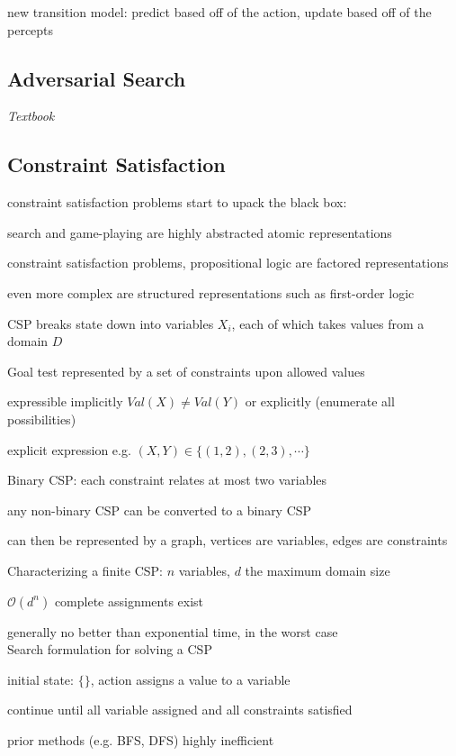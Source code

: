 \documentclass[12pt]{article}
\begin{document}
new transition model: predict based off of the action, update based off of the percepts

\subsection{Adversarial Search}

\textit{Textbook}

\subsection{Constraint Satisfaction}

\noindent
constraint satisfaction problems start to upack the black box:

search and game-playing are highly abstracted atomic representations

constraint satisfaction problems, propositional logic are factored representations

even more complex are structured representations such as first-order logic

\noindent
CSP breaks state down into variables $X_i$, each of which takes values from a domain $D$

Goal test represented by a set of constraints upon allowed values

expressible implicitly $Val(X) \neq Val(Y)$ or explicitly (enumerate all possibilities)

explicit expression e.g. $(X, Y) \in \{(1, 2), (2, 3), \cdots \}$

\noindent
Binary CSP: each constraint relates at most two variables

any non-binary CSP can be converted to a binary CSP

can then be represented by a graph, vertices are variables, edges are constraints

\noindent
Characterizing a finite CSP: $n$ variables, $d$ the maximum domain size

$\mathcal{O}(d^n)$ complete assignments exist

generally no better than exponential time, in the worst case\\

\noindent
Search formulation for solving a CSP

initial state: $\{\}$, action assigns a value to a variable

continue until all variable assigned and all constraints satisfied

prior methods (e.g. BFS, DFS) highly inefficient
\end{document}
